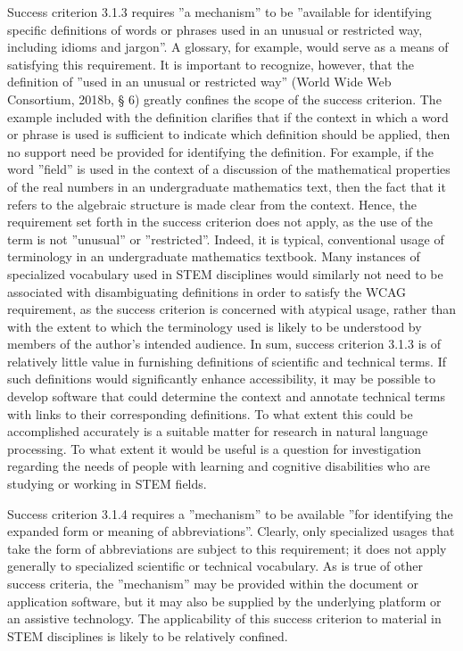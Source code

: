 \documentclass{sig-alternate} %
\begin{document}
\begin{large}
Success criterion 3.1.3 requires ”a mechanism” to be ”available for identifying specific definitions of words or phrases used in an unusual or restricted way, including idioms and jargon”. A glossary, for example, would serve as a means of satisfying this requirement. It is important to recognize, however, that the definition of ”used in an unusual or restricted way” (World Wide Web Consortium, 2018b, § 6) greatly confines the scope of the success criterion. The example included with the definition clarifies that if the context in which a word or phrase is used is sufficient to indicate which definition should be applied, then no support need be provided for identifying the definition. For example, if the word ”field” is used in the context of a discussion of the mathematical properties of the real numbers in an undergraduate mathematics text, then the fact that it refers to the algebraic structure is made clear from the context. Hence, the requirement set forth in the success criterion does not apply, as the use of the term is not ”unusual” or ”restricted”. Indeed, it is typical, conventional usage of terminology in an undergraduate mathematics textbook. Many instances of specialized vocabulary used in STEM disciplines would similarly not need to be associated with disambiguating definitions in order to satisfy the WCAG requirement, as the success criterion is concerned with atypical usage, rather than with the extent to which the terminology used is likely to be understood by members of the author’s intended audience. In sum, success criterion 3.1.3 is of relatively little value in furnishing definitions of scientific and technical terms. If such definitions would significantly enhance accessibility, it may be possible to develop software that could determine the context and annotate technical terms with links to their corresponding definitions. To what extent this could be accomplished accurately is a suitable matter for research in natural language processing. To what extent it would be useful is a question for investigation regarding the needs of people with learning and cognitive disabilities who are studying or working in STEM fields.

Success criterion 3.1.4 requires a ”mechanism” to be available ”for identifying the expanded form or meaning of abbreviations”. Clearly, only specialized usages that take the form of abbreviations are subject to this requirement; it does not apply generally to specialized scientific or technical vocabulary. As is true of other success criteria, the ”mechanism” may be provided within the document or application software, but it may also be supplied by the underlying platform or an assistive technology. The applicability of this success criterion to material in STEM disciplines is likely to be relatively confined.


\end{large}
\end{document}

